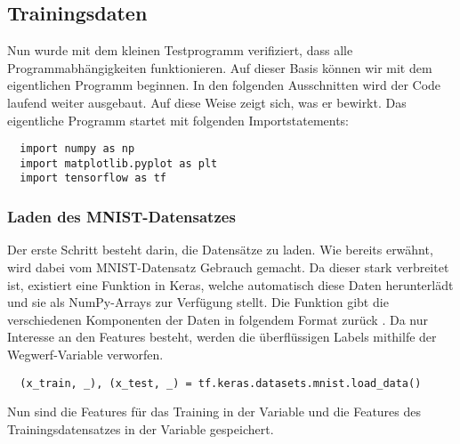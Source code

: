 \subsection{Trainingsdaten}
Nun wurde mit dem kleinen Testprogramm verifiziert, dass alle
Programmabhängigkeiten funktionieren. Auf dieser Basis können wir mit dem
eigentlichen Programm beginnen.
\para{}
In den folgenden Ausschnitten wird der Code laufend weiter ausgebaut.
Auf diese Weise zeigt sich, was er bewirkt.
Das eigentliche Programm startet mit folgenden Importstatements:
\begin{verbatim}
  import numpy as np
  import matplotlib.pyplot as plt
  import tensorflow as tf
\end{verbatim}

\subsubsection{Laden des MNIST-Datensatzes}
Der erste Schritt besteht darin, die Datensätze zu laden. Wie bereits
erwähnt, wird dabei vom MNIST-Datensatz Gebrauch gemacht. Da dieser stark verbreitet ist,
existiert eine Funktion in Keras, welche automatisch diese Daten herunterlädt
und sie als NumPy-Arrays zur Verfügung stellt.
Die Funktion gibt die verschiedenen Komponenten der Daten in folgendem Format zurück .
Da nur Interesse an den Features  besteht, werden die überflüssigen
Labels  mithilfe der Wegwerf-Variable \code{\_} verworfen.
\begin{verbatim}
  (x_train, _), (x_test, _) = tf.keras.datasets.mnist.load_data()
\end{verbatim}
Nun sind die Features für das Training in der Variable  und die
Features des Trainingsdatensatzes in der Variable  gespeichert.

